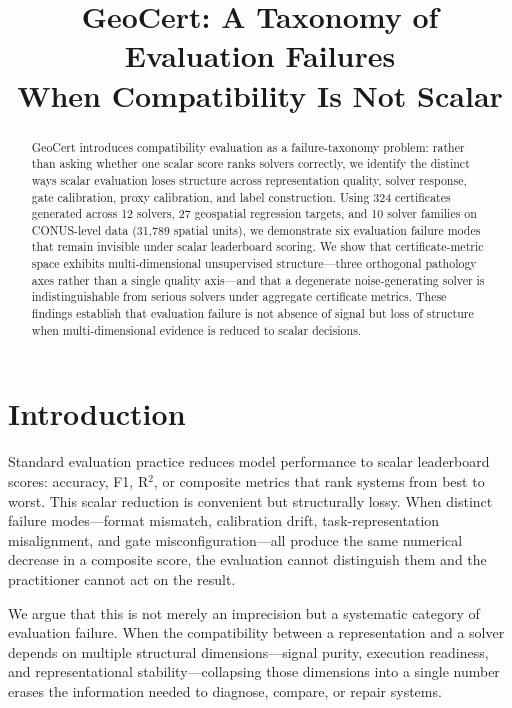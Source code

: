 \documentclass{article}
\title{GeoCert: A Taxonomy of Evaluation Failures\\When Compatibility Is Not Scalar}
\author{}
\date{}
\begin{document}
\maketitle

\begin{abstract}

GeoCert introduces compatibility evaluation as a failure-taxonomy problem: rather than asking whether one scalar score ranks solvers correctly, we identify the distinct ways scalar evaluation loses structure across representation quality, solver response, gate calibration, proxy calibration, and label construction. Using 324 certificates generated across 12 solvers, 27 geospatial regression targets, and 10 solver families on CONUS-level data (31{,}789 spatial units), we demonstrate six evaluation failure modes that remain invisible under scalar leaderboard scoring. We show that certificate-metric space exhibits multi-dimensional unsupervised structure---three orthogonal pathology axes rather than a single quality axis---and that a degenerate noise-generating solver is indistinguishable from serious solvers under aggregate certificate metrics. These findings establish that evaluation failure is not absence of signal but loss of structure when multi-dimensional evidence is reduced to scalar decisions.

\end{abstract}

\section{Introduction}

Standard evaluation practice reduces model performance to scalar leaderboard scores: accuracy, F1, R$^2$, or composite metrics that rank systems from best to worst. This scalar reduction is convenient but structurally lossy. When distinct failure modes---format mismatch, calibration drift, task-representation misalignment, and gate misconfiguration---all produce the same numerical decrease in a composite score, the evaluation cannot distinguish them and the practitioner cannot act on the result.

We argue that this is not merely an imprecision but a systematic category of evaluation failure. When the compatibility between a representation and a solver depends on multiple structural dimensions---signal purity, execution readiness, and representational stability---collapsing those dimensions into a single number erases the information needed to diagnose, compare, or repair systems.
\end{document}
